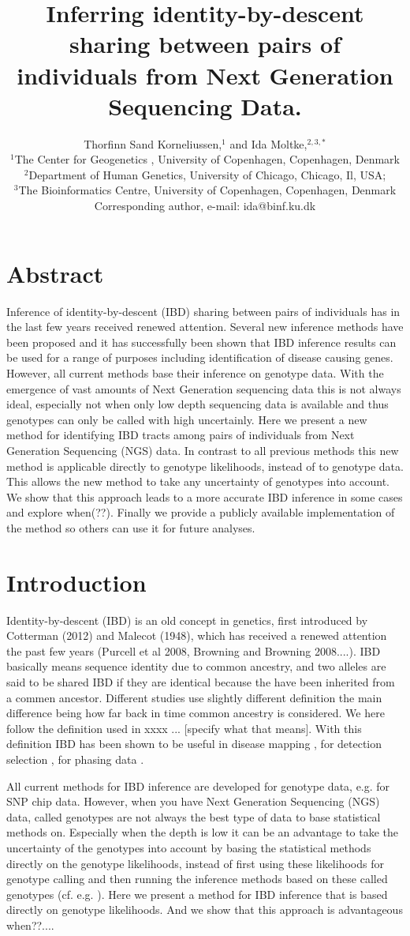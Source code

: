 \documentclass[a4paper, 11pt]{article}
\title{Inferring identity-by-descent sharing between pairs of individuals from Next Generation Sequencing Data.}
\author{Thorfinn Sand Korneliussen,$^{1}$ and Ida Moltke,$^{2,3,*}$\\
$^{1}$\small The Center for Geogenetics , University of Copenhagen, Copenhagen, Denmark\\
$^{2}$\small Department of Human Genetics, University of Chicago, Chicago, Il, USA;\\
$^{3}$\small The Bioinformatics Centre, University of Copenhagen, Copenhagen, Denmark\\
\small*Corresponding author, e-mail: ida@binf.ku.dk
}
\begin{document}
\maketitle
\section*{Abstract}
Inference of identity-by-descent (IBD) sharing between pairs of individuals has in the last few years received renewed attention. Several new inference methods have been proposed and it has successfully been shown that IBD inference results can be used for a range of purposes including identification of disease causing genes. However, all current methods base their inference on genotype data. With the emergence of vast amounts of Next Generation sequencing data this is not always ideal, especially not when only low depth sequencing data is available and thus genotypes can only be called with high uncertainly.  
Here we present a new method for identifying IBD tracts among pairs of individuals from Next Generation Sequencing (NGS) data. In contrast to all previous methods this new method is applicable directly to genotype likelihoods, instead of to genotype data. This allows the new method to take any uncertainty of genotypes into account. We show that this approach leads to a more accurate IBD inference in some cases and explore when(??). Finally we provide a publicly available implementation of the method so others can use it for future analyses. 

\section*{Introduction}
Identity-by-descent (IBD) is an old concept in genetics, first introduced by Cotterman (2012) and Malecot (1948), which has received a renewed attention the past few years (Purcell et al 2008, Browning and Browning 2008....). IBD basically means sequence identity due to common ancestry, and two alleles are said to be shared IBD if they are identical because the have been inherited from a commen ancestor. Different studies use slightly different definition the main difference being how far back in time common ancestry is considered. We here follow the definition used in xxxx ... [specify what that means].
With this definition IBD has been shown to be useful in disease mapping \cite{Albrechtsen09,Moltke11}, for detection selection \cite{Albrechtsen10}, for phasing data \cite{xx}. 

All current methods for IBD inference are developed for genotype data, e.g. for SNP chip data.  However, when you have Next Generation Sequencing (NGS) data, called genotypes are not always the best type of data to base statistical methods on. Especially when the depth is low it can be an advantage to take the uncertainty of the genotypes into account by basing the statistical methods directly on the genotype likelihoods, instead of first using these likelihoods for genotype calling and then running the inference methods based on these called genotypes (cf. e.g. \cite{ngsadmix}). 
Here we present a method for IBD inference that is based directly on genotype likelihoods. And we show that this approach is advantageous when??....
\end{document}
